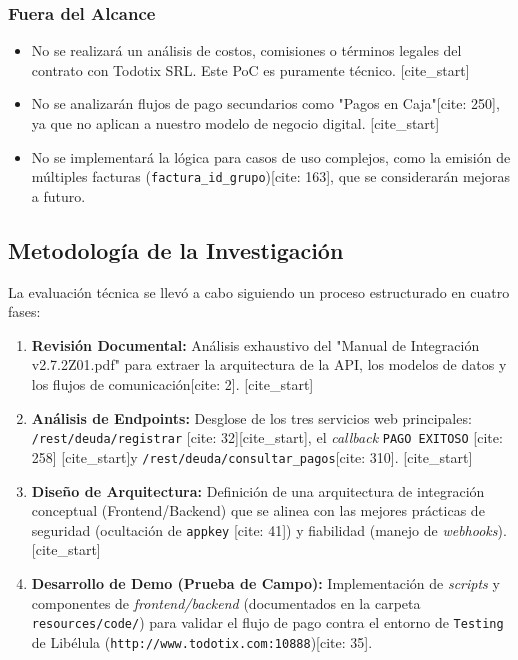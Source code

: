         \subsubsection*{Fuera del Alcance}
        \begin{itemize}
            \item No se realizará un análisis de costos, comisiones o términos legales del contrato con Todotix SRL. Este PoC es 
            puramente técnico.
            [cite_start]\item No se analizarán flujos de pago secundarios como "Pagos en Caja"[cite: 250], ya que no aplican a 
            nuestro modelo de negocio digital.
            [cite_start]\item No se implementará la lógica para casos de uso complejos, como la emisión de múltiples facturas 
            (\texttt{factura\_id\_grupo})[cite: 163], que se considerarán mejoras a futuro.
        \end{itemize}

        \subsection{Metodología de la Investigación}
        La evaluación técnica se llevó a cabo siguiendo un proceso estructurado en cuatro fases:
        \begin{enumerate}
            \item \textbf{Revisión Documental:} Análisis exhaustivo del "Manual de Integración v2.7.2Z01.pdf" 
            para extraer la arquitectura de la API, los modelos de datos y los flujos de comunicación[cite: 2].
            [cite_start]\item \textbf{Análisis de Endpoints:} Desglose de los tres servicios web principales: 
            \texttt{/rest/deuda/registrar} [cite: 32][cite_start], el \emph{callback} \texttt{PAGO EXITOSO} [cite: 258] [cite_start]y 
            \texttt{/rest/deuda/consultar\_pagos}[cite: 310].
            [cite_start]\item \textbf{Diseño de Arquitectura:} Definición de una arquitectura de integración conceptual 
            (Frontend/Backend) que se alinea con las mejores prácticas de seguridad (ocultación de \texttt{appkey} [cite: 41]) y 
            fiabilidad (manejo de \emph{webhooks}).
            [cite_start]\item \textbf{Desarrollo de Demo (Prueba de Campo):} Implementación de \emph{scripts} y componentes de 
            \emph{frontend/backend} (documentados en la carpeta \texttt{resources/code/}) para validar el flujo de pago contra el 
            entorno de \texttt{Testing} de Libélula (\texttt{http://www.todotix.com:10888})[cite: 35].
        \end{enumerate}


